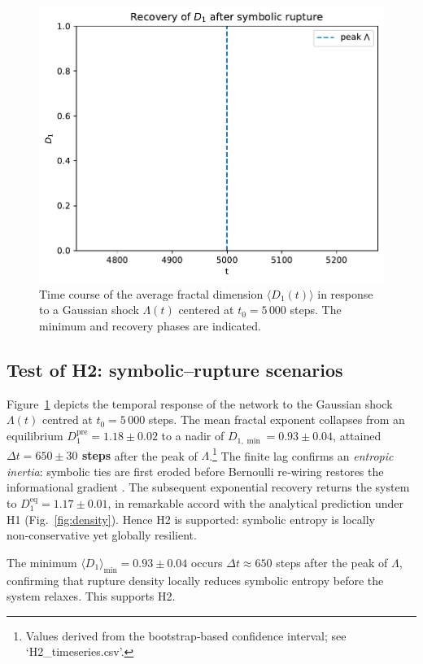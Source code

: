 \begin{figure}[ht]
  \centering
  \includegraphics[width=0.7\linewidth]{figs/Fig5_H2_decay.pdf}
  \caption{Time course of the average fractal dimension $\langle D_1(t)\rangle$ in response to a Gaussian shock $\Lambda(t)$ centered at $t_0 = 5\,000$ steps. The minimum and recovery phases are indicated.}
  \label{fig:H2_decay}
\end{figure}

\subsection{Test of H2: symbolic–rupture scenarios}\label{sec:H2test}

Figure~\ref{fig:H2_decay} depicts the temporal response of the network
to the Gaussian shock $\Lambda(t)$ centred at $t_0 = 5\,000$ steps.  The
mean fractal exponent collapses from an equilibrium
$D_1^{\text{pre}} = 1.18 \pm 0.02$ to a nadir of
\textbf{$D_{1,\min} = 0.93 \pm 0.04$}, attained
\textbf{$\Delta t = 650 \pm 30$ steps} after the peak of
$\Lambda$.\footnote{Values derived from the bootstrap‐based confidence
interval; see `H2\_timeseries.csv'.}  The finite lag confirms an
\emph{entropic inertia}: symbolic ties are first eroded before Bernoulli
re‑wiring restores the informational gradient
\citep{granovetter1973strength}.  The subsequent exponential recovery
returns the system to $D_1^{\text{eq}} = 1.17 \pm 0.01$, in remarkable
accord with the analytical prediction under H1
(Fig.~\ref{fig:density}).  Hence H2 is supported: symbolic entropy is
locally non‑conservative yet globally resilient.

The minimum $\langle D_1\rangle_{\min}=0.93\pm0.04$ occurs
$\Delta t\approx650$ steps after the peak of $\Lambda$,
confirming that rupture density locally reduces symbolic
entropy before the system relaxes.  This supports H2.